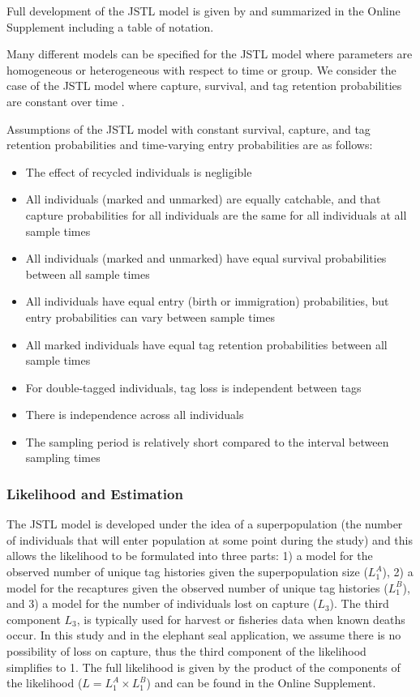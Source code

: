 \documentclass[12pt]{article}
\providecommand{\tightlist}{%
  \setlength{\itemsep}{0pt}\setlength{\parskip}{0pt}}
\begin{document}
Full development of the JSTL model is given by \citep{Cowen:2006} and summarized in the Online Supplement including a table of notation.  

Many different models can be specified for the JSTL model where
parameters are homogeneous or heterogeneous with respect to time or
group. We consider the case of the JSTL model where capture, survival,
and tag retention probabilities are constant over time \citep{Cowen:2006}.

Assumptions of the JSTL model with constant survival, capture, and tag
retention probabilities and time-varying entry probabilities are as
follows:

\begin{itemize}
\tightlist
\item
  The effect of recycled individuals is negligible
\item
  All individuals (marked and unmarked) are equally catchable, and that
  capture probabilities for all individuals are the same for all
  individuals at all sample times
\item
  All individuals (marked and unmarked) have equal survival
  probabilities between all sample times
\item
  All individuals have equal entry (birth or immigration) probabilities,
  but entry probabilities can vary between sample times
\item
  All marked individuals have equal tag retention probabilities between
  all sample times
\item
  For double-tagged individuals, tag loss is independent between tags
\item
  There is independence across all individuals
\item
  The sampling period is relatively short compared to the interval
  between sampling times
\end{itemize}

\subsubsection{Likelihood and
Estimation}\label{likelihood-and-estimation}
The JSTL model is developed under the idea of a superpopulation (the number of individuals that will enter population at some point during the study) \citep{Schwarz:1996} and this allows the likelihood to be formulated into three parts: 1) a model for the observed number of unique tag histories given the superpopulation size ($L_1^A$), 2) a model for the recaptures given the observed number of unique tag histories ($L_1^B$), and 3) a model for the number of individuals lost on capture ($L_3$).  The third component $L_3$, is typically used for harvest or fisheries data when known deaths occur.  In this study and in the elephant seal application, we assume there is no possibility of loss on capture, thus the third component of the likelihood simplifies to 1. The
full likelihood is given by the product of the components of the
likelihood (\(L=L_1^A \times L_1^B\)) and can be found in the Online Supplement.
\end{document}
